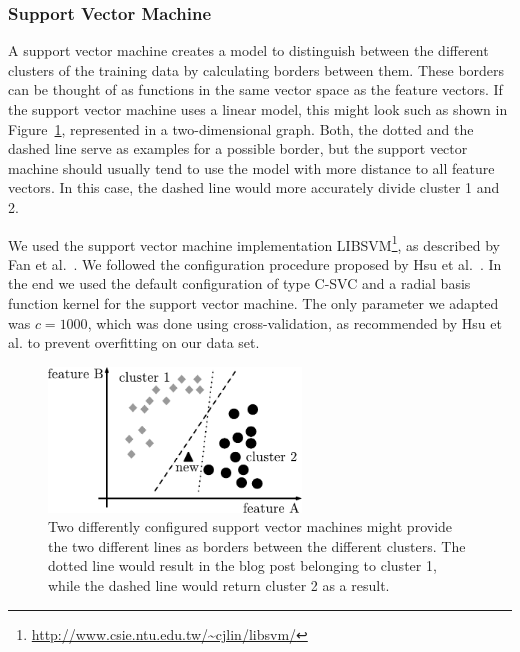 \subsubsection{Support Vector Machine}
\label{sec:support_vector_machine}


A support vector machine creates a model to distinguish between the different clusters of the training data by calculating borders between them.
These borders can be thought of as functions in the same vector space as the feature vectors.
If the support vector machine uses a linear model, this might look such as shown in Figure~\ref{fig:svm}, represented in a two-dimensional graph.
Both, the dotted and the dashed line serve as examples for a possible border, but the support vector machine should usually tend to use the model with more distance to all feature vectors.
In this case, the dashed line would more accurately divide cluster 1 and 2.


We used the support vector machine implementation LIBSVM\footnote{\url{http://www.csie.ntu.edu.tw/~cjlin/libsvm/}}, as described by Fan et al.~\cite{fan2005working}.
We followed the configuration procedure proposed by Hsu et al.~\cite{hsu2003practical}.
In the end we used the default configuration of type C-SVC and a radial basis function kernel for the support vector machine.
The only parameter we adapted was $c=1000$, which was done using cross-validation, as recommended by Hsu et al. to prevent overfitting on our data set.


\begin{figure}[ht!]
    \centering
    \includegraphics[width=0.6\textwidth]{images/svm.pdf}
    \caption{Two differently configured support vector machines might provide the two different lines as borders between the different clusters. The dotted line would result in the blog post belonging to cluster 1, while the dashed line would return cluster 2 as a result.}
    \label{fig:svm}
\end{figure}
